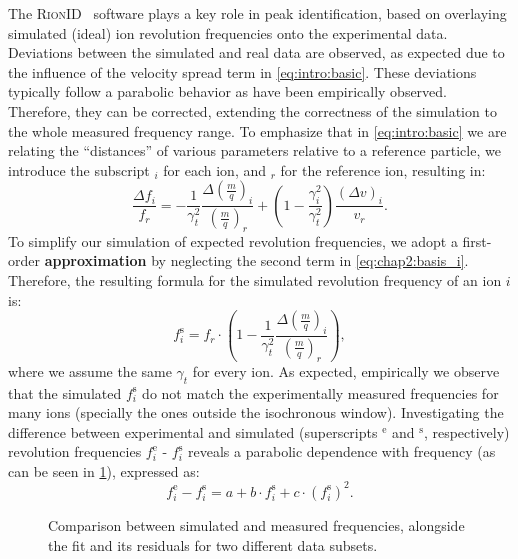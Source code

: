 The \textsc{RionID}~\cite{rionid} software plays a key role in peak identification, based on overlaying simulated (ideal) ion revolution frequencies onto the experimental data. Deviations between the simulated and real data are observed, as expected due to the influence of the velocity spread term in \cref{eq:intro:basic}. These deviations typically follow a parabolic behavior as have been empirically observed. Therefore, they can be corrected, extending the correctness of the simulation to the whole measured frequency range.
\newpar
To emphasize that in \cref{eq:intro:basic} we are relating the ``distances'' of various parameters relative to a reference particle, we introduce the subscript $_i$ for each ion, and $_r$ for the reference ion, resulting in:
\begin{equation} 
    \frac{{\Delta}f_{i}}{f_{r}} = -\frac{1}{\gamma_{t}^{2}}\frac{{\Delta}\left(\frac{m}{q}\right)_{i}}{\left(\frac{m}{q}\right)_{r}}+\left(1-\frac{\gamma_{i}^{2}}{\gamma_{t}^{2}}\right)\frac{\left(\Delta v\right)_{i}}{v_{r}}.
    \label{eq:chap2:basis_i} 
\end{equation}
To simplify our simulation of expected revolution frequencies, we adopt a first-order \textbf{approximation} by neglecting the second term in \cref{eq:chap2:basis_i}. Therefore, the resulting formula for the simulated revolution frequency of an ion $i$ is:
  \begin{equation}
    f^{\mathrm{s}}_{i} =f_{r} \cdot\left(1-\frac{1}{\gamma_{t}^{2}}\frac{{\Delta}\left(\frac{m}{q}\right)_{i}}{\left(\frac{m}{q}\right)_{r}}\right),
    \label{eq:chap2:basis_i2}
  \end{equation}
where we assume the same $\gamma_t$ for every ion.
\newpar
As expected, empirically we observe that the simulated $f^{\mathrm{s}}_{i}$ do not match the experimentally measured frequencies for many ions (specially the ones outside the isochronous window). Investigating the difference between experimental and simulated (superscripts $^\mathrm{e}$ and $^\mathrm{s}$, respectively) revolution frequencies $f^{\mathrm{e}}_{i}$ - $f^{\mathrm{s}}_{i}$ reveals a parabolic dependence with frequency (as can be seen in \cref{fig:chap2:deviationsRionID}), expressed as:
\begin{equation} 
    f^{\mathrm{e}}_{i} - f^{\mathrm{s}}_{i} = a + b\cdot f^{\mathrm{s}}_{i} + c \cdot \left(f^{\mathrm{s}}_{i}\right)^2.
    \label{eq:chap2:basis_i3} 
\end{equation}

\begin{figure}[hbt]
    \centering
    \hspace{0.05cm}
    \caption{Comparison between simulated and measured frequencies, alongside the fit and its residuals for two different data subsets.}
    \label{fig:chap2:deviationsRionID}
\end{figure}

